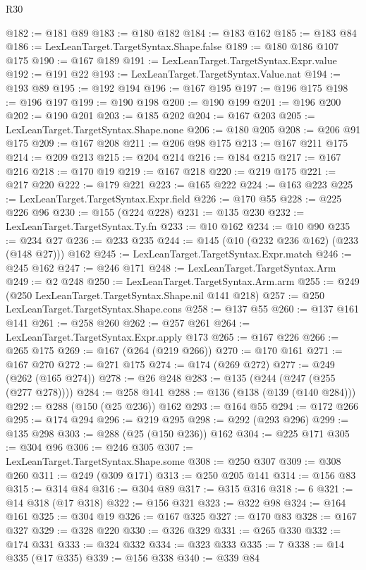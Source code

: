 \begin{lexlean}{R30}
\begin{coremodule}
@182 := @181 @89
@183 := @180 @182
@184 := @183 @162
@185 := @183 @84
@186 := LexLeanTarget.TargetSyntax.Shape.false
@189 := @180 @186 @107 @175
@190 := @167 @189
@191 := LexLeanTarget.TargetSyntax.Expr.value
@192 := @191 @22
@193 := LexLeanTarget.TargetSyntax.Value.nat
@194 := @193 @89
@195 := @192 @194
@196 := @167 @195
@197 := @196 @175
@198 := @196 @197
@199 := @190 @198
@200 := @190 @199
@201 := @196 @200
@202 := @190 @201
@203 := @185 @202
@204 := @167 @203
@205 := LexLeanTarget.TargetSyntax.Shape.none
@206 := @180 @205
@208 := @206 @91 @175
@209 := @167 @208
@211 := @206 @98 @175
@213 := @167 @211 @175
@214 := @209 @213
@215 := @204 @214
@216 := @184 @215
@217 := @167 @216
@218 := @170 @19
@219 := @167 @218
@220 := @219 @175
@221 := @217 @220
@222 := @179 @221
@223 := @165 @222
@224 := @163 @223
@225 := LexLeanTarget.TargetSyntax.Expr.field
@226 := @170 @55
@228 := @225 @226 @96
@230 := @155 (@224 @228)
@231 := @135 @230
@232 := LexLeanTarget.TargetSyntax.Ty.fn
@233 := @10 @162
@234 := @10 @90
@235 := @234 @27
@236 := @233 @235
@244 := @145 (@10 (@232 @236 @162) (@233 (@148 @27))) @162
@245 := LexLeanTarget.TargetSyntax.Expr.match
@246 := @245 @162
@247 := @246 @171
@248 := LexLeanTarget.TargetSyntax.Arm
@249 := @2 @248
@250 := LexLeanTarget.TargetSyntax.Arm.arm
@255 := @249 (@250 LexLeanTarget.TargetSyntax.Shape.nil @141 @218)
@257 := @250 LexLeanTarget.TargetSyntax.Shape.cons
@258 := @137 @55
@260 := @137 @161 @141
@261 := @258 @260
@262 := @257 @261
@264 := LexLeanTarget.TargetSyntax.Expr.apply @173
@265 := @167 @226
@266 := @265 @175
@269 := @167 (@264 (@219 @266))
@270 := @170 @161
@271 := @167 @270
@272 := @271 @175
@274 := @174 (@269 @272)
@277 := @249 (@262 (@165 @274))
@278 := @26 @248
@283 := @135 (@244 (@247 (@255 (@277 @278))))
@284 := @258 @141
@288 := @136 (@138 (@139 (@140 @284)))
@292 := @288 (@150 (@25 @236)) @162
@293 := @164 @55
@294 := @172 @266
@295 := @174 @294
@296 := @219 @295
@298 := @292 (@293 @296)
@299 := @135 @298
@303 := @288 (@25 (@150 @236)) @162
@304 := @225 @171
@305 := @304 @96
@306 := @246 @305
@307 := LexLeanTarget.TargetSyntax.Shape.some
@308 := @250 @307
@309 := @308 @260
@311 := @249 (@309 @171)
@313 := @250 @205 @141
@314 := @156 @83
@315 := @314 @84
@316 := @304 @89
@317 := @315 @316
@318 := 6
@321 := @14 @318 (@17 @318)
@322 := @156 @321
@323 := @322 @98
@324 := @164 @161
@325 := @304 @19
@326 := @167 @325
@327 := @170 @83
@328 := @167 @327
@329 := @328 @220
@330 := @326 @329
@331 := @265 @330
@332 := @174 @331
@333 := @324 @332
@334 := @323 @333
@335 := 7
@338 := @14 @335 (@17 @335)
@339 := @156 @338
@340 := @339 @84

\end{coremodule}
\end{lexlean}
